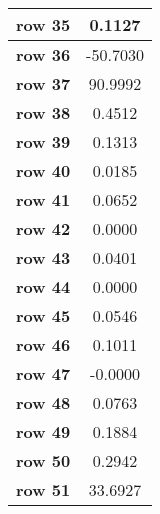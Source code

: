 \begin{tiny}
\begin{tabular}{|l|c|}
\textbf{row 35}&0.1127\\\hline
\textbf{row 36}&-50.7030\\\hline
\textbf{row 37}&90.9992\\\hline
\textbf{row 38}&0.4512\\\hline
\textbf{row 39}&0.1313\\\hline
\textbf{row 40}&0.0185\\\hline
\textbf{row 41}&0.0652\\\hline
\textbf{row 42}&0.0000\\\hline
\textbf{row 43}&0.0401\\\hline
\textbf{row 44}&0.0000\\\hline
\textbf{row 45}&0.0546\\\hline
\textbf{row 46}&0.1011\\\hline
\textbf{row 47}&-0.0000\\\hline
\textbf{row 48}&0.0763\\\hline
\textbf{row 49}&0.1884\\\hline
\textbf{row 50}&0.2942\\\hline
\textbf{row 51}&33.6927\\\hline
\end{tabular}
\end{tiny}